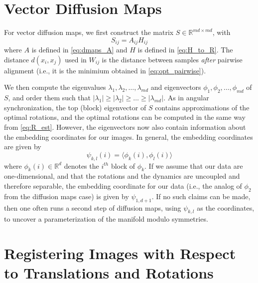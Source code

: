 \documentclass{pnastwo}
\begin{document}
\begin{article}
\begin{materials}
\section{Vector Diffusion Maps \cite{singer2012vector}}

For vector diffusion maps, we first construct the matrix $S \in \mathbb{R}^{md \times md}$, with
\begin{equation}
	S_{ij} = A_{ij} H_{ij}
\end{equation}
%
where $A$ is defined in \eqref{eq:dmaps_A} and $H$ is defined in \eqref{eq:H_to_R}.
%
The distance $d(x_i, x_j)$ used in $W_{ij}$ is the distance between samples {\em after} pairwise alignment (i.e., it is the minimium obtained in \eqref{eq:opt_pairwise}). 

We then compute the eigenvalues $\lambda_1, \lambda_2, \dots, \lambda_{md}$ and eigenvectors $\phi_1, \phi_2, \dots, \phi_{md}$ of $S$, and order them such that $|\lambda_1| \ge |\lambda_2| \ge \dots \ge |\lambda_{md}|$.
%
As in angular synchronization, the top (block) eigenvector of $S$ contains approximations of the optimal rotations, and the optimal rotations can be computed in the same way from \eqref{eq:R_est}.
%
However, the eigenvectors now also contain information about the embedding coordinates for our images.
%
In general, the embedding coordinates are given by 
\begin{equation}
\psi_{k,l} (i) = \langle \phi_k(i), \phi_l(i) \rangle
\end{equation}
where $\phi_k(i) \in \mathbb{R}^d$ denotes the $i^{th}$ block of $\phi_k$.
%
If we assume that our data are one-dimensional, and that the rotations and the dynamics are uncoupled and therefore separable, the embedding coordinate for our data (i.e., the analog of $\phi_2$ from the diffusion maps case) is given by $\psi_{1,d+1}$.
%
If no such claims can be made, then one often runs a second step of diffusion maps, using $\psi_{k,l}$ as the coordinates, to uncover a parameterization of the manifold modulo symmetries.

\section{Registering Images with Respect to Translations and Rotations} \label{subsec:trans_rot_register}


\end{materials}
\end{article}
\end{document}
